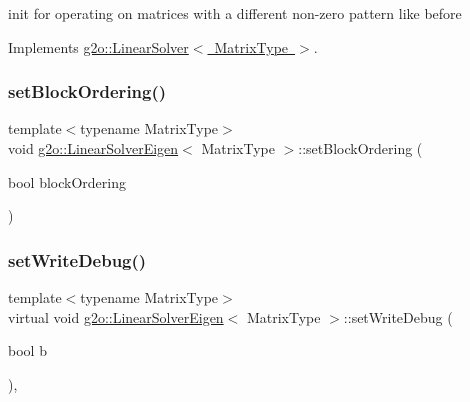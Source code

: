 init for operating on matrices with a different non-\/zero pattern like before 

Implements \mbox{\hyperlink{classg2o_1_1_linear_solver_aebd961a94ef6de1bc66d2ca41dd2b17b}{g2o\+::\+Linear\+Solver$<$ Matrix\+Type $>$}}.

\mbox{\label{classg2o_1_1_linear_solver_eigen_a33a924364fc517e69c5ade5aeacd8ee3}} 
\subsubsection{\texorpdfstring{set\+Block\+Ordering()}{setBlockOrdering()}}
{\footnotesize\ttfamily template$<$typename Matrix\+Type$>$ \\
void \mbox{\hyperlink{classg2o_1_1_linear_solver_eigen}{g2o\+::\+Linear\+Solver\+Eigen}}$<$ Matrix\+Type $>$\+::set\+Block\+Ordering (\begin{DoxyParamCaption}\item[{bool}]{block\+Ordering }\end{DoxyParamCaption})\hspace{0.3cm}{\ttfamily [inline]}}

\mbox{\label{classg2o_1_1_linear_solver_eigen_a5ceaab3ba944d327b21f7329c7e19c8c}} 
\subsubsection{\texorpdfstring{set\+Write\+Debug()}{setWriteDebug()}}
{\footnotesize\ttfamily template$<$typename Matrix\+Type$>$ \\
virtual void \mbox{\hyperlink{classg2o_1_1_linear_solver_eigen}{g2o\+::\+Linear\+Solver\+Eigen}}$<$ Matrix\+Type $>$\+::set\+Write\+Debug (\begin{DoxyParamCaption}\item[{bool}]{b }\end{DoxyParamCaption})\hspace{0.3cm}{\ttfamily [inline]}, {\ttfamily [virtual]}}



